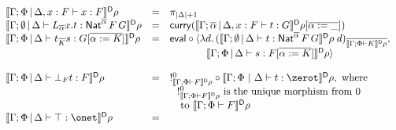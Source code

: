 \documentclass[runningheads]{llncs}
\begin{document}
\begin{figure}[t]
\begin{adjustbox}{varwidth=6in, max width=5.3in, fbox, center}
\[\begin{array}{lll}
\dsem{\Gamma;\Phi \,|\, \Delta,x :F \vdash x : F} \rho& = &
\pi_{|\Delta|+1}\\
\dsem{\Gamma;\emptyset \,|\, \Delta \vdash L_{\overline \alpha} x.t : \Nat^{\overline
    \alpha} \,F \,G}\rho & = &  \curry (\dsem{\Gamma;\overline \alpha
  \,|\, \Delta, x : F \vdash t: G}\rho[\overline{\alpha := \_}])\\
\dsem{\Gamma;\Phi \,|\, \Delta \vdash t_{\overline K} s:
  G [\overline{\alpha := K}]}\rho & = & \eval \circ \langle
  \lambda d.\,(\dsem{\Gamma;\emptyset \,|\, \Delta \vdash t :
  \Nat^{\overline{\alpha}} \,F \,G}\rho\; d)_{\overline{\dsem{\Gamma;\Phi
      \vdash K}\rho}},\\ 
 & & \hspace*{0.5in} \dsem{\Gamma;\Phi \,|\,
    \Delta \vdash s: F [\overline{\alpha := K}]}\rho \rangle\\ 
& & \\
\dsem{\Gamma;\Phi \,|\, \Delta \vdash \bot_F t : F} \rho& = &
!^0_{\dsem{\Gamma;\Phi \vdash F}\rho} \circ
  \dsem{\Gamma;\Phi~|~\Delta \vdash t : \zerot}\rho, \mbox{ where } \\
 & & \hspace*{0.1in} !^0_{\dsem{\Gamma;\Phi \vdash F}\rho}
\mbox{ is the unique morphism from } 0\\
 & & \hspace*{0.1in} \mbox{ to } \dsem{\Gamma;\Phi \vdash F}\rho\\
\dsem{\Gamma;\Phi \,|\, \Delta \vdash \top : \onet}\rho & = &

\end{array}\]
\end{adjustbox}
\end{figure}
\end{document}
